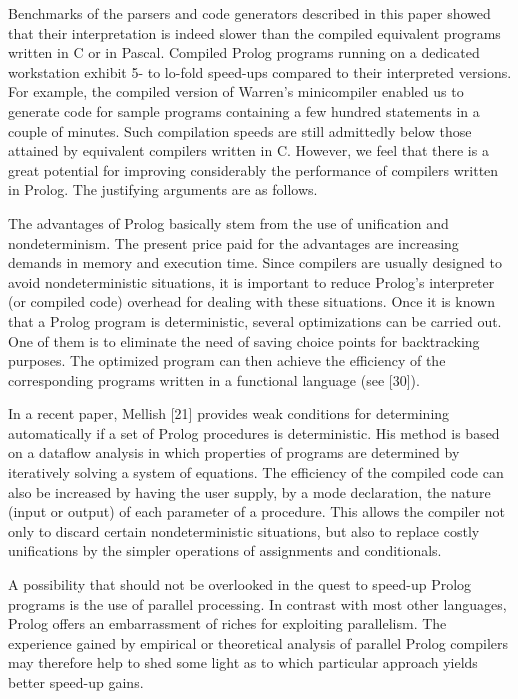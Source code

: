 Benchmarks of the parsers and code generators described in this paper showed
that their interpretation is indeed slower than the compiled equivalent programs
written in C or in Pascal. Compiled Prolog programs running on a dedicated
workstation exhibit 5- to lo-fold speed-ups compared to their interpreted versions.
For example, the compiled version of Warren’s minicompiler enabled us
to generate code for sample programs containing a few hundred statements in a
couple of minutes. Such compilation speeds are still admittedly below those
attained by equivalent compilers written in C. However, we feel that there is a
great potential for improving considerably the performance of compilers written
in Prolog. The justifying arguments are as follows. 

The advantages of Prolog basically stem from the use of unification and
nondeterminism. The present price paid for the advantages are increasing demands
in memory and execution time. Since compilers are usually designed to
avoid nondeterministic situations, it is important to reduce Prolog’s interpreter
(or compiled code) overhead for dealing with these situations. Once it is known
that a Prolog program is deterministic, several optimizations can be carried out.
One of them is to eliminate the need of saving choice points for backtracking
purposes. The optimized program can then achieve the efficiency of the corresponding
programs written in a functional language (see [30]). 

In a recent paper, Mellish [21] provides weak conditions for determining
automatically if a set of Prolog procedures is deterministic. His method is based
on a dataflow analysis in which properties of programs are determined by
iteratively solving a system of equations. The efficiency of the compiled code can
also be increased by having the user supply, by a mode declaration, the nature
(input or output) of each parameter of a procedure. This allows the compiler not
only to discard certain nondeterministic situations, but also to replace costly
unifications by the simpler operations of assignments and conditionals. 

A possibility that should not be overlooked in the quest to speed-up Prolog
programs is the use of parallel processing. In contrast with most other languages,
Prolog offers an embarrassment of riches for exploiting parallelism. The experience
gained by empirical or theoretical analysis of parallel Prolog compilers may
therefore help to shed some light as to which particular approach yields better
speed-up gains. 

